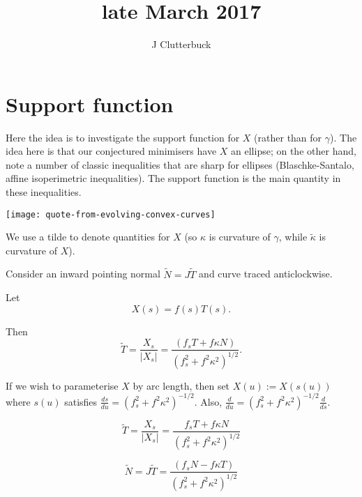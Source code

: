 \documentclass[12pt, a4paper]{amsart}
\author{J Clutterbuck}
\theoremstyle{remark}
\begin{document}
  



\title{late March 2017  }
\maketitle





\section*{Support function}
Here the idea is to investigate the support function for $X$ (rather than for $\gamma$).   The idea here is that our conjectured minimisers have $X$ an ellipse;   on the other hand, note a number of classic inequalities that are sharp for ellipses (Blaschke-Santalo, affine isoperimetric inequalities).   The support function is the main quantity in these inequalities.  

\texttt{[image: quote-from-evolving-convex-curves]}


\newcommand{\tk}{\tilde{\kappa}}
\newcommand{\tT}{\tilde{T}}
\newcommand{\tN}{\tilde{N}}
\newcommand{\tH}{\tilde{h}}


We use a tilde to denote quantities for $X$ (so $\kappa$ is curvature of $\gamma$, while $\tk$ is curvature of $X$).   

 Consider an inward pointing normal $\tN=J\tT$ and curve traced anticlockwise.

Let $$X(s)=f(s)T(s).$$

Then 
$$ \tT= \frac{X_s}{|X_s|}=   \frac{(f_s T+ f\kappa N)}{(f_s^2+f^2\kappa^2)^{1/2}}  .   $$

If we wish to parameterise $X$ by arc length, then set $X(u):=X(s(u))$ where $s(u)$ satisfies $\frac{ds}{du}=\left({f_s^2+f^2\kappa^2}\right)^{-1/2}$.   Also, $\frac{d}{du}=\left({f_s^2+f^2\kappa^2}\right)^{-1/2}\frac d{ds}$.


$$\tT=\frac{X_s}{|X_s|}=\frac{f_sT+f\kappa N}{(f_s^2+f^2\kappa^2)^{1/2}} $$

$$\tN=J\tT= \frac{(f_s N- f\kappa T)}{(f_s^2+f^2\kappa^2)^{1/2}} $$
\end{document}
